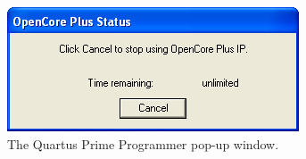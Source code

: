 \documentclass[11pt, twoside, pdftex]{article}
\newcommand{\commonPath}{../../Common}
\begin{document}
\begin{figure}[H]
   \begin{center}
      \includegraphics[scale=1]{screenshots/figure67.png}
   \end{center}
   \caption{The Quartus Prime Programmer pop-up window.} 
   \label{fig:QUARTUS_programmerpopup}
\end{figure}



\end{document}
